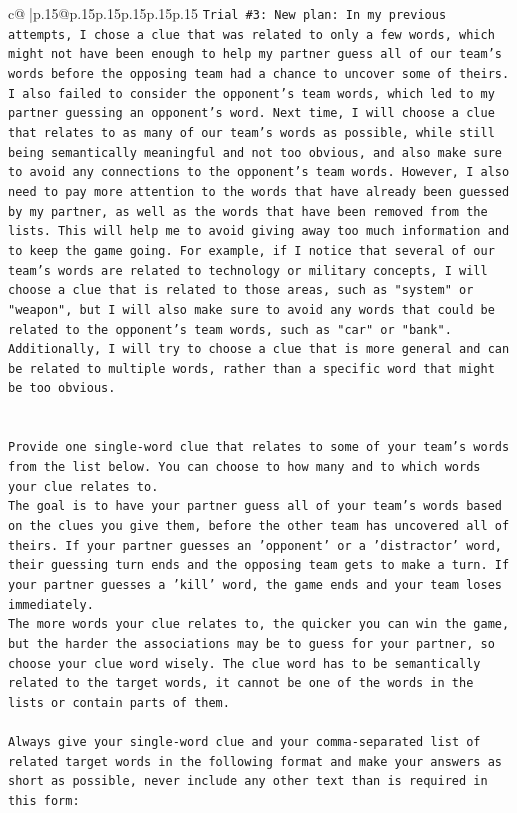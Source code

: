 \documentclass{article}
\begin{document}
{\begin{supertabular}{c@{$\;$}|p{.15\linewidth}@{}p{.15\linewidth}p{.15\linewidth}p{.15\linewidth}p{.15\linewidth}p{.15\linewidth}}
{{{\texttt{Trial \#3: New plan: In my previous attempts, I chose a clue that was related to only a few words, which might not have been enough to help my partner guess all of our team's words before the opposing team had a chance to uncover some of theirs. I also failed to consider the opponent's team words, which led to my partner guessing an opponent's word. Next time, I will choose a clue that relates to as many of our team's words as possible, while still being semantically meaningful and not too obvious, and also make sure to avoid any connections to the opponent's team words. However, I also need to pay more attention to the words that have already been guessed by my partner, as well as the words that have been removed from the lists. This will help me to avoid giving away too much information and to keep the game going. For example, if I notice that several of our team's words are related to technology or military concepts, I will choose a clue that is related to those areas, such as "system" or "weapon", but I will also make sure to avoid any words that could be related to the opponent's team words, such as "car" or "bank". Additionally, I will try to choose a clue that is more general and can be related to multiple words, rather than a specific word that might be too obvious.} \\
\\ 
\\ 
\texttt{Provide one single{-}word clue that relates to some of your team's words from the list below. You can choose to how many and to which words your clue relates to.} \\
\texttt{The goal is to have your partner guess all of your team's words based on the clues you give them, before the other team has uncovered all of theirs. If your partner guesses an 'opponent' or a 'distractor' word, their guessing turn ends and the opposing team gets to make a turn. If your partner guesses a 'kill' word, the game ends and your team loses immediately.} \\
\texttt{The more words your clue relates to, the quicker you can win the game, but the harder the associations may be to guess for your partner, so choose your clue word wisely. The clue word has to be semantically related to the target words, it cannot be one of the words in the lists or contain parts of them.} \\
\\ 
\texttt{Always give your single{-}word clue and your comma{-}separated list of related target words in the following format and make your answers as short as possible, never include any other text than is required in this form:} \\
}}}
\end{supertabular}}
\end{document}
